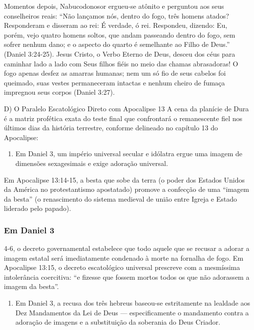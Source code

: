 Momentos depois, Nabucodonosor ergueu-se atônito e perguntou aos seus conselheiros reais:
``Não lançamos nós, dentro do fogo, três homens atados? Responderam e disseram ao rei: É verdade, ó rei. Respondeu, dizendo: Eu, porém, vejo quatro homens soltos, que andam passeando dentro do fogo, sem sofrer nenhum dano; e o aspecto do quarto é semelhante ao Filho de Deus.'' (Daniel 3:24-25).
Jesus Cristo, o Verbo Eterno de Deus, desceu dos céus para caminhar lado a lado com Seus filhos fiéis no meio das chamas abrasadoras! O fogo apenas desfez as amarras humanas; nem um só fio de seus cabelos foi queimado, suas vestes permaneceram intactas e nenhum cheiro de fumaça impregnou seus corpos (Daniel 3:27).

D) O Paralelo Escatológico Direto com Apocalipse 13
A cena da planície de Dura é a matriz profética exata do teste final que confrontará o remanescente fiel nos últimos dias da história terrestre, conforme delineado no capítulo 13 do Apocalipse:

\begin{enumerate}
  \item Em Daniel 3, um império universal secular e idólatra ergue uma imagem de dimensões sexagesimais e exige adoração universal.
\end{enumerate}

Em Apocalipse 13:14-15, a besta que sobe da terra (o poder dos Estados Unidos da América no protestantismo apostatado) promove a confecção de uma ``imagem da besta'' (o renascimento do sistema medieval de união entre Igreja e Estado liderado pelo papado).

\subsubsection*{Em Daniel 3}
4-6, o decreto governamental estabelece que todo aquele que se recusar a adorar a imagem estatal será imediatamente condenado à morte na fornalha de fogo.
Em Apocalipse 13:15, o decreto escatológico universal prescreve com a mesmíssima intolerância coercitiva: ``e fizesse que fossem mortos todos os que não adorassem a imagem da besta''.
\begin{enumerate}
  \item Em Daniel 3, a recusa dos três hebreus baseou-se estritamente na lealdade aos Dez Mandamentos da Lei de Deus — especificamente o mandamento contra a adoração de imagens e a substituição da soberania do Deus Criador.
\end{enumerate}

